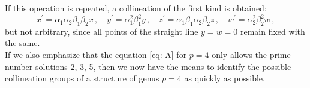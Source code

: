\documentclass[leqno]{article}
\begin{document}
If this operation is repeated, a collineation of the first kind is obtained:
\begin{equation}\label{eq: 2.6}
x^\prime = \alpha_1 \alpha_2 \beta_1 \beta_2 x \, , \quad y^\prime = \alpha_1^2 \beta_1^2 y \, , \quad z^\prime = \alpha_1 \beta_1 \alpha_2 \beta_2 z \, , \quad w^\prime = \alpha_2^2 \beta_2^2 w \, , \tag{6}
\end{equation}
but not arbitrary, since all points of the straight line $ y = w = 0 $ remain fixed with the same. \\
If we also emphasize that the equation \eqref{eq: A} for $ p = 4 $ only allows the prime number solutions 2, 3, 5, then we now have the means to identify the possible collineation groups of a structure of genus $ p = 4 $ as quickly as possible.
\end{document}
